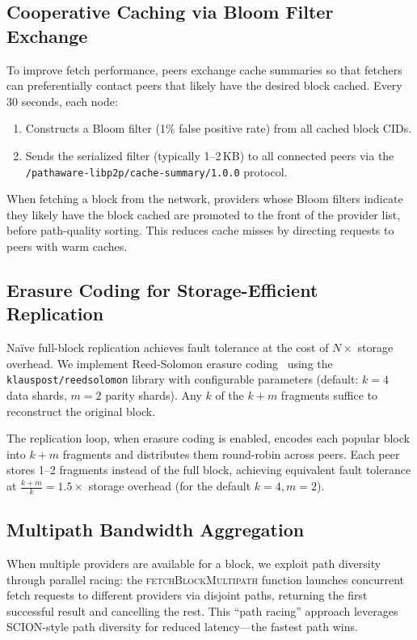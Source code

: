 \documentclass[sigconf,nonacm]{acmart}
\begin{document}
\subsection{Cooperative Caching via Bloom Filter Exchange}

To improve fetch performance, peers exchange cache summaries so that fetchers can preferentially contact peers that likely have the desired block cached. Every 30 seconds, each node:
\begin{enumerate}
\item Constructs a Bloom filter (1\% false positive rate) from all cached block CIDs.
\item Sends the serialized filter (typically 1--2\,KB) to all connected peers via the \texttt{/pathaware-libp2p/cache-summary/1.0.0} protocol.
\end{enumerate}

When fetching a block from the network, providers whose Bloom filters indicate they likely have the block cached are promoted to the front of the provider list, before path-quality sorting. This reduces cache misses by directing requests to peers with warm caches.

\subsection{Erasure Coding for Storage-Efficient Replication}

Na\"ive full-block replication achieves fault tolerance at the cost of $N\times$ storage overhead. We implement Reed-Solomon erasure coding~\cite{kangasharju2002caching} using the \texttt{klauspost/reedsolomon} library with configurable parameters (default: $k{=}4$ data shards, $m{=}2$ parity shards). Any $k$ of the $k{+}m$ fragments suffice to reconstruct the original block.

The replication loop, when erasure coding is enabled, encodes each popular block into $k{+}m$ fragments and distributes them round-robin across peers. Each peer stores 1--2 fragments instead of the full block, achieving equivalent fault tolerance at $\frac{k+m}{k} = 1.5\times$ storage overhead (for the default $k{=}4, m{=}2$).

\subsection{Multipath Bandwidth Aggregation}

When multiple providers are available for a block, we exploit path diversity through parallel racing: the \textsc{fetchBlockMultipath} function launches concurrent fetch requests to different providers via disjoint paths, returning the first successful result and cancelling the rest. This ``path racing'' approach leverages SCION-style path diversity for reduced latency---the fastest path wins.
\end{document}
